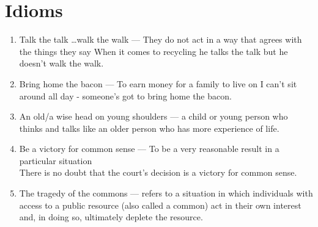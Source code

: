 \documentclass[oneside]{book}
\begin{document}
\section{Idioms}
\begin{enumerate}
    \item Talk the talk \ldots walk the walk --- They do not act in a way that agrees with the things they say
    \footnotesize When it comes to recycling he talks the talk but he doesn't walk the walk. \normalsize
    \item Bring home the bacon --- To earn money for a family to live on \footnotesize I can't sit around all day - someone's got to bring home the bacon. \normalsize
    \item An old/a wise head on young shoulders --- a child or young person who thinks and talks like an older person who has more experience of life.
    \item Be a victory for common sense --- To be a very reasonable result in a particular situation\\
    \footnotesize There is no doubt that the court's decision is a victory for common sense. \normalsize
    \item The tragedy of the commons --- refers to a situation in which individuals with access to a public resource (also called a common) act in their own interest and, in doing so, ultimately deplete the resource.
\end{enumerate}
\end{document}
